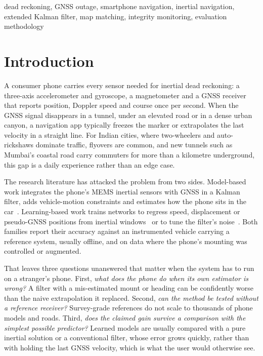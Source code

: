 \documentclass[conference]{IEEEtran}
\begin{document}
\begin{IEEEkeywords}
dead reckoning, GNSS outage, smartphone navigation, inertial navigation,
extended Kalman filter, map matching, integrity monitoring, evaluation
methodology
\end{IEEEkeywords}

\section{Introduction}
A consumer phone carries every sensor needed for inertial dead reckoning: a
three-axis accelerometer and gyroscope, a magnetometer and a GNSS receiver that
reports position, Doppler speed and course once per second. When the GNSS
signal disappears in a tunnel, under an elevated road or in a dense urban
canyon, a navigation app typically freezes the marker or extrapolates the last
velocity in a straight line. For Indian cities, where two-wheelers and
auto-rickshaws dominate traffic, flyovers are common, and new tunnels such as
Mumbai's coastal road carry commuters for more than a kilometre underground,
this gap is a daily experience rather than an edge case.

The research literature has attacked the problem from two sides. Model-based
work integrates the phone's MEMS inertial sensors with GNSS in a Kalman filter,
adds vehicle-motion constraints and estimates how the phone sits in the
car~\cite{niu2012iphone,mu2019arbitrary,wang2025velocity}. Learning-based work
trains networks to regress speed, displacement or pseudo-GNSS positions from
inertial windows~\cite{wang2023deepodometry,vishnukumar2026denoiser,shin2025speed,xiao2025speed}
or to tune the filter's noise~\cite{brossard2020aiimu}. Both families report
their accuracy against an instrumented vehicle carrying a reference
system, usually offline, and on data where the phone's mounting was controlled
or augmented.

That leaves three questions unanswered that matter when the system has to run
on a stranger's phone. First, \emph{what does the phone do when its own
estimator is wrong?} A filter with a mis-estimated mount or heading can be
confidently worse than the naive extrapolation it replaced. Second, \emph{can the
method be tested without a reference receiver?} Survey-grade references do not
scale to thousands of phone models and roads. Third, \emph{does the claimed gain
survive a comparison with the simplest possible predictor?} Learned models are
usually compared with a pure inertial solution or a conventional filter, whose
error grows quickly, rather than with holding the last GNSS velocity, which is
what the user would otherwise see.
\end{document}
